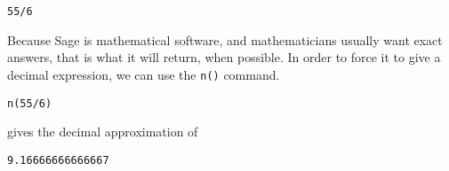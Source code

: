 \begin{verbatim}
55/6
\end{verbatim}

Because Sage is mathematical software, and mathematicians usually
want exact answers, that is what it will return, when possible. In order
to force it to give a decimal expression, we can use the
{\tt n()} command.

\begin{verbatim}
n(55/6)
\end{verbatim}

gives the decimal approximation of

\begin{verbatim}
9.16666666666667
\end{verbatim}

